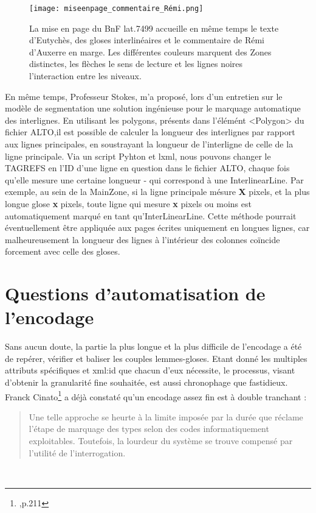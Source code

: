 \documentclass[a4paper, twoside, 12pt]{book}
\begin{document}
\begin{figure}[H]
    \centering
    \texttt{[image: miseenpage\_commentaire\_Rémi.png]}
    \caption{La mise en page du BnF lat.7499 accueille en même temps le texte d'Eutychès, des gloses interlinéaires et le commentaire de Rémi d'Auxerre en marge. Les différentes couleurs marquent des Zones distinctes, les flèches le sens de lecture et les lignes noires l'interaction entre les niveaux.}
\end{figure}

En même temps, Professeur Stokes, m'a proposé, lors d'un entretien sur le modèle de segmentation une solution ingénieuse pour le marquage automatique des interlignes. En utilisant les polygons, présents dans l'élémént <Polygon> du fichier ALTO,il est possible de calculer la longueur des interlignes par rapport aux lignes principales, en soustrayant la longueur de l'interligne de celle de la ligne principale. Via un script Pyhton et lxml, nous pouvons changer le TAGREFS en l'ID d'une ligne en question dans le fichier ALTO, chaque fois qu'elle mesure une certaine longueur - qui correspond à une InterlinearLine. Par exemple, au sein de la MainZone, si la ligne principale mésure \textbf{X} pixels, et la plus longue glose \textbf{x} pixels, toute ligne qui mesure \textbf{x} pixels ou moins est automatiquement marqué en tant qu'InterLinearLine. Cette méthode pourrait éventuellement être appliquée aux pages écrites uniquement en longues lignes, car malheureusement la longueur des lignes à l'intérieur des colonnes coïncide forcement avec celle des gloses.

\section{Questions d'automatisation de l'encodage}

Sans aucun doute, la partie la plus longue et la plus difficile de l'encodage a été de repérer, vérifier et baliser les couples lemmes-gloses. Etant donné les multiples attributs spécifiques et xml:id que chacun d'eux nécessite, le processus, visant d'obtenir la granularité fine souhaitée, est aussi chronophage que fastidieux. Franck Cinato\footnote{\cite{cinato2015priscien},p.211} a déjà constaté qu'un encodage assez fin est à double tranchant : \blockquote{Une telle approche se heurte à la limite imposée par la durée que réclame l’étape de marquage des types selon des codes informatiquement exploitables. Toutefois, la lourdeur du système se trouve compensé par l'utilité de l'interrogation.} \\
\end{document}
